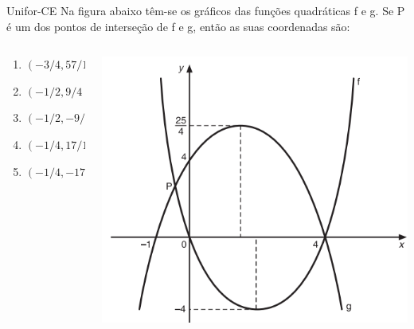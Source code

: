 \documentclass[11pt]{beamer}
\newif\ifgab
\newcommand{\gab}[1]{%
  \ifgab
    \textcolor{red!80!black}{\textbf{#1}}%
  \else
    #1%
  \fi
}
\begin{document}
\begin{frame}{Unifor-CE}
    Na figura abaixo têm-se os gráficos das funções quadráticas f e g. Se P é um dos pontos de interseção de f e g, então as suas coordenadas são:

    \begin{columns}
        \begin{column}{0.4\textwidth}
            \begin{enumerate}[a]
                \item $(-{3}/{4},{57}/{16})$ 
                \item \gab{$(-{1}/{2},{9}/{4})$}  %
                \item $(-{1}/{2},-{9}/{4})$
                \item $(-{1}/{4},{17}/{16})$ 
                \item $(-{1}/{4},-{17}/{16})$
            \end{enumerate}
        \end{column}

        \begin{column}{0.6\textwidth}
            \centering
            \includegraphics[width=0.9\linewidth]{imagens/Unifor-CE.png}
        \end{column}
    \end{columns}
    
\end{frame}
\end{document}
